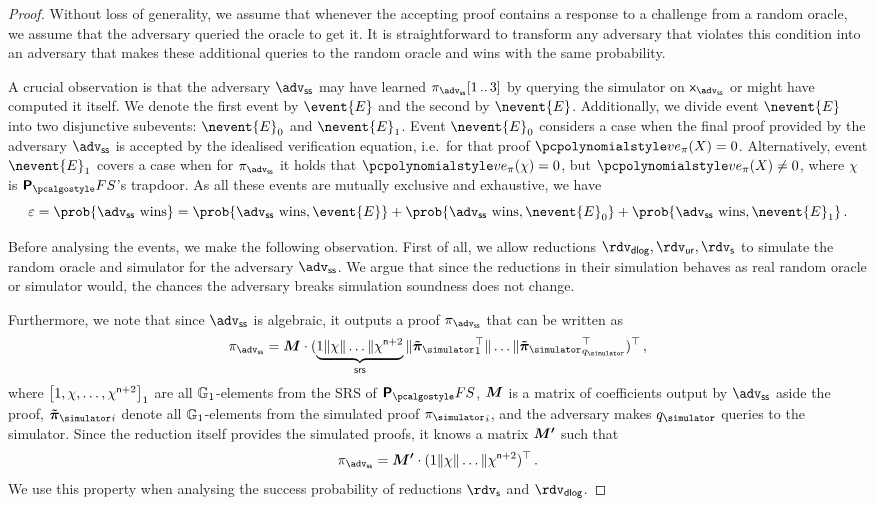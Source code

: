 \documentclass[runningheads,11pt]{llncs}
\let\spvec\vec
\let\vec\accentvec
\let\spvec\vec
\let\vec\spvec
\def\vec#1{\mathchoice{\mbox{\boldmath$\displaystyle#1$}}
  {\mbox{\boldmath$\textstyle#1$}} {\mbox{\boldmath$\scriptstyle#1$}}
  {\mbox{\boldmath$\scriptscriptstyle#1$}}}
\begin{document}
\begin{proof}
  Without loss of generality, we assume that whenever the accepting proof
  contains a response to a challenge from a random oracle, we assume that the
  adversary queried the oracle to get it. It is straightforward to transform any
  adversary that violates this condition into an adversary that makes these
  additional queries to the random oracle and wins with the same probability.

  A crucial observation is that the adversary $\advss$ may have learned
  $\zkproof_{\advss}\range{1}{3}$ by querying the simulator on $\inp_{\advss}$
  or might have computed it itself. We denote the first event by $\event{E}$ and
  the second by $\nevent{E}$.
  Additionally, we divide event $\nevent{E}$ into two disjunctive subevents:
  $\nevent{E}_0$ and $\nevent{E}_1$. Event $\nevent{E}_0$ considers a case when
  the final proof provided by the adversary $\advss$ is accepted by the
  idealised verification equation, i.e.~for that proof $\vereq_\zkproof(X) = 0$.
  Alternatively, event $\nevent{E}_1$ covers a case when for $\zkproof_\advss$
  it holds that $\vereq_\zkproof(\chi) = 0$, but $\vereq_\zkproof(X) \neq 0$, where $\chi$ is
  $\plonkprotfs$'s trapdoor.
  As all these events are mutually exclusive and exhaustive, we have
  \[
    \eps = \prob{\advss \text{ wins}} = \prob{\advss \text{ wins}, \event{E}} +
    \prob{\advss \text{ wins}, \nevent{E}_0} + \prob{\advss \text{ wins},
      \nevent{E}_1}\,.
  \]

  Before analysing the events, we make the following observation. First of all,
  we allow reductions $\rdv_\dlog, \rdvur, \rdvs$ to simulate the random oracle
  and simulator for the adversary $\advss$. We argue that since the reductions
  in their simulation behaves as real random oracle or simulator would, the
  chances the adversary breaks simulation soundness does not change.

  Furthermore, we note that since $\advss$ is algebraic, it outputs a proof
  $\zkproof_\advss$ that can be written as
  \[
    \zkproof_\advss = \vec{M} \cdot (\underbrace{1 \| \chi \| \ldots \|
      \chi^{\noofc + 2}}_{\srs} \|
    \vec{\tilde{\zkproof}_{\simulator}}_1^{\top} \| \ldots \|
    \vec{\tilde{\zkproof}_{\simulator}}_{q_{\simulator}}^\top)^\top\,,
  \]
  where $\left[1, \chi, \ldots, \chi^{\mathsf{n} + 2}\right]_{1}$ are all
  $\mathbb{G}_1$-elements from the SRS of $\plonkprotfs$, $\vec{M}$ is a matrix of
  coefficients output by $\advss$ aside the proof,
  $\vec{\tilde{\zkproof}_{\simulator}}_i$ denote all $\mathbb{G}_1$-elements from the
  simulated proof ${\zkproof_{\simulator}}_i$, and the adversary makes
  $q_\simulator$ queries to the simulator.  Since the reduction itself provides
  the simulated proofs, it knows a matrix $\vec{M'}$ such that
  \begin{equation}
    \label{eq:M_prim}
    \zkproof_\advss = \vec{M'} \cdot (1 \| \chi \| \ldots \| \chi^{\noofc + 2})^\top\,.
  \end{equation}
  We use this property when analysing the success probability of reductions
  $\rdvs$ and $\rdvdlog$.


\end{proof}
\end{document}
